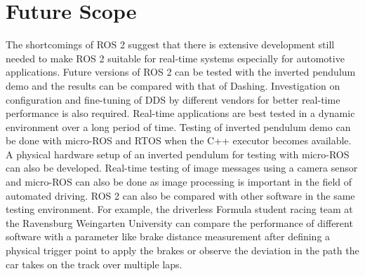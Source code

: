 \documentclass[%
xelatex,
	oneside,		%
	12pt,			%
	parskip=half,	%
	abstracton,
	chapterprefix=true%
    appendixprefix=true]
{scrbook}
\begin{document}
\section{Future Scope}
\vspace*{0.2cm}
The shortcomings of ROS 2 suggest that there is extensive development still needed to make ROS 2 suitable for real-time systems especially for automotive applications.
 Future versions of ROS 2 can be tested with the inverted pendulum demo and the results can be compared with that of Dashing. Investigation on configuration and fine-tuning of DDS by different vendors for better real-time performance is also required.
 \vspace*{0.15cm}
 Real-time applications are best tested in a dynamic environment over a long period of time. Testing of inverted pendulum demo can be done with micro-ROS and RTOS when the C++ executor becomes available. A physical hardware setup of an inverted pendulum for testing with micro-ROS can also be developed.
Real-time testing of image messages using a camera sensor and micro-ROS can also be done as image processing is important in the field of automated driving.
ROS 2 can also be compared with other software in the same testing environment. For example, the driverless Formula student racing team at the Ravensburg Weingarten University can compare the performance of different software with a parameter like brake distance measurement after defining a physical trigger point to apply the brakes or observe the deviation in the path the car takes on the track over multiple laps.

	\listoffigures
	\listoftables
		
		

\end{document}
